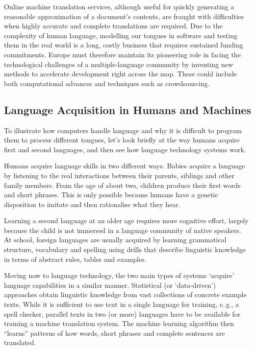 \begin{multicols}{2}

Online machine translation services, although useful for quickly generating a reasonable approximation of a document’s contents, are fraught with difficulties when highly accurate and complete translations are required. Due to the complexity of human language, modelling our tongues in software and testing them in the real world is a long, costly business that requires sustained funding commitments. Europe must therefore maintain its pioneering role in facing the technological challenges of a multiple-language community by inventing new methods to accelerate development right across the map. These could include both computational advances and techniques such as crowdsourcing.

\subsection{Language Acquisition in Humans and Machines}

To illustrate how computers handle language and why it is difficult to program them to process different tongues, let’s look briefly at the way humans acquire first and second languages, and then see how language technology systems work.

Humans acquire language skills in two different ways. Babies acquire a language by listening to the real interactions between their parents, siblings and other family members. From the age of about two, children produce their first words and short phrases. This is only possible because humans have a genetic disposition to imitate and then rationalise what they hear. 

Learning a second language at an older age requires more cognitive effort, largely because the child is not immersed in a language community of native speakers. At school, foreign languages are usually acquired by learning grammatical structure, vocabulary and spelling using drills that describe linguistic knowledge in terms of abstract rules, tables and examples.


Moving now to language technology, the two main types of systems ‘acquire’ language capabilities in a similar manner. Statistical (or ‘data-driven’) approaches obtain linguistic knowledge from vast collections of concrete example texts. While it is sufficient to use text in a single language for training, e.\,g., a spell checker, parallel texts in two (or more) languages have to be available for training a machine translation system. The machine learning algorithm then “learns” patterns of how words, short phrases and complete sentences are translated. 


\end{multicols}
